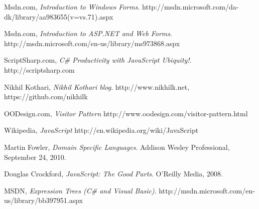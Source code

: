 \begin{thebibliography}{9}
  Msdn.com,
  \emph{Introduction to Windows Forms}.
  http://msdn.microsoft.com/da-dk/library/aa983655(v=vs.71).aspx

  Msdn.com,
  \emph{Introduction to ASP.NET and Web Forms}.
  http://msdn.microsoft.com/en-us/library/ms973868.aspx

  ScriptSharp.com,
  \emph{C\# Productivity with JavaScript Ubiquity!}.
  http://scriptsharp.com

  Nikhil Kothari,
  \emph{Nikhil Kothari blog}.
  http://www.nikhilk.net, https://github.com/nikhilk
  
  OODesign.com,
  \emph{Visitor Pattern}
  http://www.oodesign.com/visitor-pattern.html

  Wikipedia,
  \emph{JavaScript}
  http://en.wikipedia.org/wiki/JavaScript

  Martin Fowler,
  \emph{Domain Specific Languages}.
  Addison Wesley Professional,
  September 24, 2010.

  Douglas Crockford,
  \emph{JavaScript: The Good Parts}.
  O’Reilly Media,
  2008.

  MSDN,
  \emph{Expression Trees (C\# and Visual Basic)}.
  http://msdn.microsoft.com/en-us/library/bb397951.aspx

\end{thebibliography}










